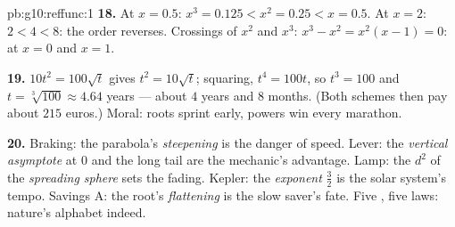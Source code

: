 \begin{solution}{pb:g10:reffunc:1}
\textbf{18.} At $x = 0.5$: $x^3 = 0.125 < x^2 = 0.25 < x =
0.5$. At $x = 2$: $2 < 4 < 8$: the order reverses. Crossings of
$x^2$ and $x^3$: $x^3 - x^2 = x^2(x - 1) = 0$: at $x = 0$ and
$x = 1$.

\textbf{19.} $10t^2 = 100\sqrt t$ gives $t^2 = 10\sqrt t$;
squaring, $t^4 = 100t$, so $t^3 = 100$ and
$t = \sqrt[3]{100} \approx 4.64$ years --- about $4$ years and
$8$ months. (Both schemes then pay about $215$ euros.) Moral:
roots sprint early, powers win every marathon.

\textbf{20.} Braking: the parabola's \emph{steepening} is the
danger of speed. Lever: the \emph{vertical asymptote} at $0$
and the long tail are the mechanic's advantage. Lamp: the
$d^2$ of the \emph{spreading sphere} sets the fading. Kepler:
the \emph{exponent} $\frac32$ is the solar system's tempo.
Savings A: the root's \emph{flattening} is the slow saver's
fate. Five , five laws: nature's alphabet indeed.
\end{solution}
